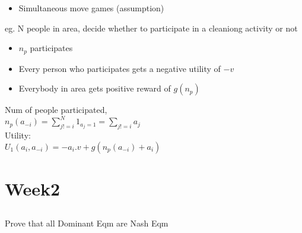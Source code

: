 \documentclass{article}
\begin{document}
\begin{itemize}[itemsep=0pt,parsep=0pt,topsep=0pt]
  \item Simultaneous move games (assumption)
\end{itemize}

eg. N people in area, decide whether to participate in a cleaniong activity or not\\


\begin{itemize}[itemsep=0pt,parsep=0pt,topsep=0pt]
  \item $n_p$ participates
  \item Every person who participates gets a negative utility of $-v$
  \item Everybody in area gets positive reward of $g(n_p)$
\end{itemize}
 
Num of people participated, \\
$n_p(a_{-i}) = \sum_{j != i}^{N} 1_{a_j = 1} = \sum_{j!=i} a_j$ \\

Utility:\\
$U_1(a_i, a_{-i}) = -a_i . v + g(n_p(a_{-i}) + a_i)$

\section{Week2}

\subsection{}

Prove that all Dominant Eqm are Nash Eqm
\end{document}
